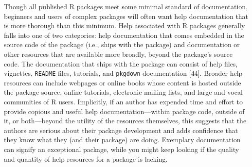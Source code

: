 \documentclass[10pt,letterpaper]{article}
\begin{document}
Though all published R packages meet some minimal standard of
documentation, beginners and users of complex packages will often want
help documentation that is more thorough than this minimum. Help
associated with R packages generally falls into one of two categories:
help documentation that comes embedded in the source code of the package
(i.e., ships with the package) and documentation or other resources that
are available more broadly, beyond the package's source code. The
documentation that ships with the package can consist of help files,
vignettes, \texttt{README} files, tutorials, and \texttt{pkgdown}
documentation {[}44{]}. Broader help resources can include webpages or
online books whose content is hosted outside the package source, online
tutorials, electronic mailing lists, and large and vocal communities of
R users. Implicitly, if an author has expended time and effort to
provide copious and useful help documentation---within package code,
outside of it, or both---beyond the utility of the resources themselves,
this suggests that the authors are serious about their package
development and adds confidence that they know what they (and their
package) are doing. Exemplary documentation can signify an exceptional
package, while you might keep looking if the quality and quantity of
help resources for a package is lacking.
\end{document}
